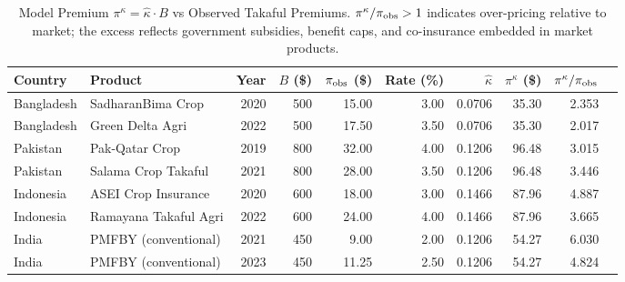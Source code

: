 \begin{table}
\caption{Model Premium $\pi^\kappa=\hat{\kappa}\cdot B$ vs Observed Takaful Premiums. $\pi^\kappa/\pi_{\rm obs}>1$ indicates over-pricing relative to market; the excess reflects government subsidies, benefit caps, and co-insurance embedded in market products.}
\label{tab:premium_compare}
\begin{tabular}{llrrrrrrrr}
\toprule
Country & Product & Year & $B$ (\$) & $\pi_{\rm obs}$ (\$) & Rate (\%) & $\hat{\kappa}$ & $\pi^\kappa$ (\$) & $\pi^\kappa/\pi_{\rm obs}$ \\
\midrule
Bangladesh & SadharanBima Crop & 2020 & 500 & 15.00 & 3.00 & 0.0706 & 35.30 & 2.353 \\
Bangladesh & Green Delta Agri & 2022 & 500 & 17.50 & 3.50 & 0.0706 & 35.30 & 2.017 \\
Pakistan & Pak-Qatar Crop & 2019 & 800 & 32.00 & 4.00 & 0.1206 & 96.48 & 3.015 \\
Pakistan & Salama Crop Takaful & 2021 & 800 & 28.00 & 3.50 & 0.1206 & 96.48 & 3.446 \\
Indonesia & ASEI Crop Insurance & 2020 & 600 & 18.00 & 3.00 & 0.1466 & 87.96 & 4.887 \\
Indonesia & Ramayana Takaful Agri & 2022 & 600 & 24.00 & 4.00 & 0.1466 & 87.96 & 3.665 \\
India & PMFBY (conventional) & 2021 & 450 & 9.00 & 2.00 & 0.1206 & 54.27 & 6.030 \\
India & PMFBY (conventional) & 2023 & 450 & 11.25 & 2.50 & 0.1206 & 54.27 & 4.824 \\
\bottomrule
\end{tabular}
\end{table}
